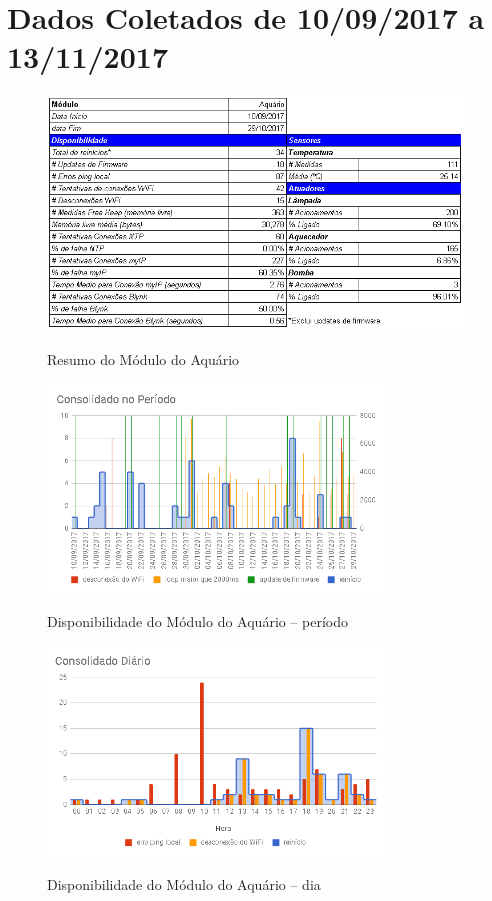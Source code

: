 \chapter{Dados Coletados de 10/09/2017 a 13/11/2017}
\label{DataCollected}

\begin{figure}[H]
	\centering
	\caption{Resumo do Módulo do Aquário}
	\includegraphics[width=1.0\textwidth]{resumoAqua}
	\label{fig:resumoAqua}
\end{figure}

\begin{figure}[H]
	\centering
	\caption{Disponibilidade do Módulo do Aquário -- período}
	\includegraphics[width=0.8\textwidth]{AquaPeriodo}
	\label{fig:AquaPeriodo}
\end{figure}

\begin{figure}[H]
	\centering
	\caption{Disponibilidade do Módulo do Aquário -- dia}
	\includegraphics[width=0.8\textwidth]{AquaDiaDisp}
	\label{fig:AquaDiaDisp}
\end{figure}

